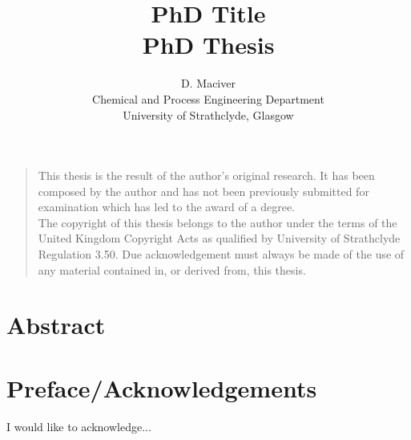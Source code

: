 \documentclass[a4paper,oneside,11pt]{book}
\title{PhD Title \\ PhD Thesis}
\author{D. Maciver\\[-0.8ex]
\small Chemical and Process Engineering Department\\[-0.8ex]
\small University of Strathclyde, Glasgow\\}
\begin{document}
\maketitle


\frontmatter

\vspace*{\fill}
\noindent
\begin{quote}
	\centering
	This thesis is the result of the author's original research. It has been composed by the author and has not been previously submitted for examination which has led to the award of a degree. \\[5pt]
	The copyright of this thesis belongs to the author under the terms of the United Kingdom Copyright Acts as qualified by University of Strathclyde Regulation 3.50. Due acknowledgement must always be made of the use of any material contained in, or derived from, this thesis. \\[5pt]
\end{quote}
\vspace*{\fill}



\chapter{Abstract}



\tableofcontents

\listoffigures

\listoftables



\chapter{Preface/Acknowledgements}
I would like to acknowledge... 



\mainmatter
\end{document}
